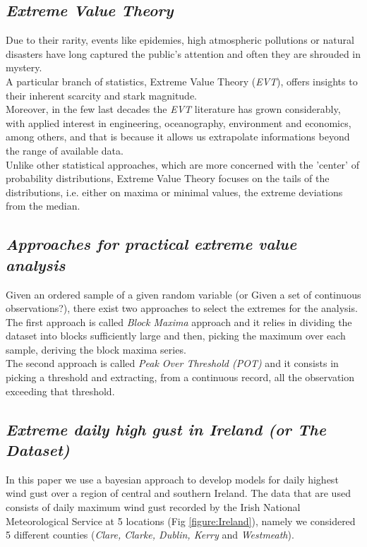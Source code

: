 \documentclass[preprint,12pt]{elsarticle}
\begin{document}
\subsection{\textit{Extreme Value Theory}}
Due to their rarity, events like epidemies, high atmospheric pollutions or natural disasters have long captured the public's attention and often they are shrouded in mystery.\\
A particular branch of statistics, Extreme Value Theory (\textit{EVT}), offers insights to their inherent scarcity and stark magnitude. \\
Moreover, in the few last decades the \textit{EVT} literature has grown considerably, with applied interest in engineering, oceanography, environment and economics, among others, and that is because it allows us extrapolate informations beyond the range of available data.
\\
Unlike other statistical approaches, which are more concerned with the 'center' of probability distributions, Extreme Value Theory focuses on the tails of the distributions, i.e. either on maxima or minimal values, the extreme deviations from the median.


\subsection{\textit{Approaches for practical extreme value analysis }}
Given an ordered sample of a given random variable (or Given a set of continuous observations?), there exist two approaches to select the extremes for the analysis.
\\ 
The first approach is called \textit{Block Maxima} approach and it relies in dividing the dataset into blocks sufficiently large and then, picking the maximum over each sample, deriving the block maxima series.
\\
The second approach is called \textit{Peak Over Threshold (POT)} and it consists in picking a threshold and extracting, from a continuous record, all the observation exceeding that threshold.

\subsection{\textit{Extreme daily high gust in Ireland (or The Dataset)}}

In this paper we use a bayesian approach to develop models  for daily highest wind gust over a region
of central and southern Ireland. The data that are used consists of daily maximum wind gust recorded by the Irish National Meteorological Service at 5 locations (Fig \ref{figure:Ireland}), namely we considered 5 different counties (\textit{Clare, Clarke, Dublin, Kerry} and \textit{Westmeath}).
\end{document}
